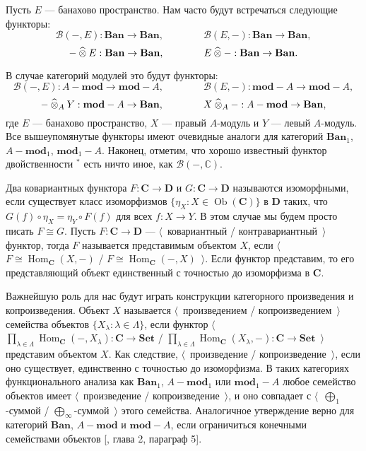 Пусть $E$ --- банахово пространство. Нам часто будут встречаться следующие
функторы:
$$
\mathcal{B}(-,E):\mathbf{Ban}\to\mathbf{Ban},
\qquad\qquad
\mathcal{B}(E,-):\mathbf{Ban}\to\mathbf{Ban},
$$
$$
-\mathbin{\widehat{\otimes}} E:\mathbf{Ban}\to\mathbf{Ban},
\qquad\qquad
E\mathbin{\widehat{\otimes}} -:\mathbf{Ban}\to\mathbf{Ban}.
$$

В случае категорий модулей это будут функторы:
$$
\mathcal{B}(-,E):A-\mathbf{mod}\to \mathbf{mod}-A,
\qquad\qquad
\mathcal{B}(E,-):\mathbf{mod}-A\to \mathbf{mod}-A,
$$
$$
-\mathbin{\widehat{\otimes}}_{A} Y:\mathbf{mod}-A\to\mathbf{Ban},
\qquad\qquad
X\mathbin{\widehat{\otimes}}_{A} -:A-\mathbf{mod}\to\mathbf{Ban},
$$
где $E$ --- банахово пространство, $X$ --- правый $A$-модуль и $Y$ --- левый
$A$-модуль. Все вышеупомянутые функторы имеют очевидные аналоги для категорий
$\mathbf{Ban}_1$, $A-\mathbf{mod}_1$, $\mathbf{mod}_1-A$. Наконец, отметим, что
хорошо известный функтор двойственности ${}^*$ есть ничто иное, как
$\mathcal{B}(-,\mathbb{C})$.

Два ковариантных функтора $F:\mathbf{C}\to\mathbf{D}$ и
$G:\mathbf{C}\to\mathbf{D}$ называются изоморфными, если существует класс
изоморфизмов $\{\eta_X:X\in\operatorname{Ob}(\mathbf{C})\}$ в $\mathbf{D}$
таких, что $G(f)\circ\eta_X=\eta_Y\circ F(f)$ для всех $f:X\to Y$. В этом случае
мы будем просто писать $F\cong G$. Пусть $F:\mathbf{C}\to\mathbf{D}$ ---
$\langle$~ковариантный / контравариантный~$\rangle$ функтор, тогда $F$
называется представимым объектом $X$, если
$\langle$~$F\cong\operatorname{Hom}_{\mathbf{C}}(X,-)$ /
$F\cong\operatorname{Hom}_{\mathbf{C}}(-,X)$~$\rangle$. Если функтор представим,
то его представляющий объект единственный с точностью до изоморфизма в
$\mathbf{C}$.

Важнейшую роль для нас будут играть конструкции категорного произведения и
копроизведения. Объект $X$ называется $\langle$~произведением /
копроизведением~$\rangle$ семейства объектов $\{ X_\lambda:\lambda\in\Lambda
\}$, если функтор
$\langle$~$\prod_{\lambda\in\Lambda}
    \operatorname{Hom}_{\mathbf{C}}(-,X_{\lambda})
    :\mathbf{C}\to\mathbf{Set}$
/
$\prod_{\lambda\in\Lambda}
    \operatorname{Hom}_{\mathbf{C}}(X_{\lambda},-)
    :\mathbf{C}\to\mathbf{Set}$~$\rangle$
представим объектом $X$. Как следствие, $\langle$~произведение /
копроизведение~$\rangle$, если оно существует, единственно с точностью до
изоморфизма. В таких категориях функционального анализа как $\mathbf{Ban}_1$,
$A-\mathbf{mod}_1$ или $\mathbf{mod}_1-A$ любое семейство объектов имеет
$\langle$~произведение / копроизведение~$\rangle$, и оно совпадает с
$\langle$~$\bigoplus_1$-суммой / $\bigoplus_\infty$-суммой~$\rangle$ этого
семейства. Аналогичное утверждение верно для категорий $\mathbf{Ban}$,
$A-\mathbf{mod}$ и $\mathbf{mod}-A$, если ограничиться конечными семействами
объектов [\cite{HelLectAndExOnFuncAn}, глава 2, параграф 5].


